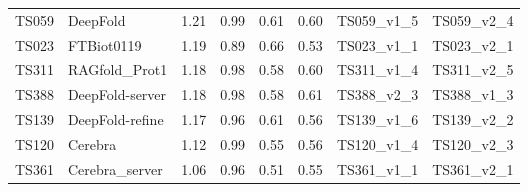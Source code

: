 \begin{table}[ht]
{\begin{tabular}{llllllll}
TS059 & DeepFold & 1.21 & 0.99 & 0.61 & 0.60 & TS059\_v1\_5 & TS059\_v2\_4 \\ 
TS023 & FTBiot0119 & 1.19 & 0.89 & 0.66 & 0.53 & TS023\_v1\_1 & TS023\_v2\_1 \\ 
TS311 & RAGfold\_Prot1 & 1.18 & 0.98 & 0.58 & 0.60 & TS311\_v1\_4 & TS311\_v2\_5 \\ 
TS388 & DeepFold-server & 1.18 & 0.98 & 0.58 & 0.61 & TS388\_v2\_3 & TS388\_v1\_3 \\ 
TS139 & DeepFold-refine & 1.17 & 0.96 & 0.61 & 0.56 & TS139\_v1\_6 & TS139\_v2\_2 \\ 
TS120 & Cerebra & 1.12 & 0.99 & 0.55 & 0.56 & TS120\_v1\_4 & TS120\_v2\_3 \\ 
TS361 & Cerebra\_server & 1.06 & 0.96 & 0.51 & 0.55 & TS361\_v1\_1 & TS361\_v2\_1 \\ 
\bottomrule
\end{tabular}%
}
\end{table}
